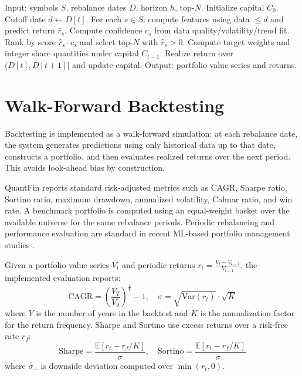 \documentclass[conference]{IEEEtran}
\begin{document}
\begin{algorithm}
\caption{Leakage-aware monthly rebalancing (simplified)}
\label{alg:rebalance}
\begin{algorithmic}
\STATE Input: symbols $S$, rebalance dates $D$, horizon $h$, top-$N$.
\STATE Initialize capital $C_0$.
\STATE Cutoff date $d \leftarrow D[t]$.
\STATE For each $s \in S$: compute features using data $\le d$ and predict return $\hat{r}_{s}$.
\STATE Compute confidence $c_s$ from data quality/volatility/trend fit.
\STATE Rank by score $\hat{r}_{s}\cdot c_s$ and select top-$N$ with $\hat{r}_{s} > 0$.
\STATE Compute target weights and integer share quantities under capital $C_{t-1}$.
\STATE Realize return over $(D[t], D[t+1]]$ and update capital.
\ENDFOR
\STATE Output: portfolio value series and returns.
\end{algorithmic}
\end{algorithm}

\section{Walk-Forward Backtesting}\label{sec:backtest}
Backtesting is implemented as a walk-forward simulation: at each rebalance date, the system generates predictions using only historical data up to that date, constructs a portfolio, and then evaluates realized returns over the next period. This avoids look-ahead bias by construction.

QuantFin reports standard risk-adjusted metrics such as CAGR, Sharpe ratio, Sortino ratio, maximum drawdown, annualized volatility, Calmar ratio, and win rate. A benchmark portfolio is computed using an equal-weight basket over the available universe for the same rebalance periods. Periodic rebalancing and performance evaluation are standard in recent ML-based portfolio management studies \cite{lim2022dynamicrebalancing,aithal2023realtime}.

Given a portfolio value series $V_t$ and periodic returns $r_t=\frac{V_t-V_{t-1}}{V_{t-1}}$, the implemented evaluation reports:
\begin{equation}
\mathrm{CAGR} = \left(\frac{V_T}{V_0}\right)^{\tfrac{1}{Y}}-1,\quad \sigma = \sqrt{\mathrm{Var}(r_t)}\cdot\sqrt{K}
\end{equation}
where $Y$ is the number of years in the backtest and $K$ is the annualization factor for the return frequency. Sharpe and Sortino use excess returns over a risk-free rate $r_f$:
\begin{equation}
\mathrm{Sharpe} = \frac{\mathbb{E}[r_t-r_f/K]}{\sigma},\quad
\mathrm{Sortino} = \frac{\mathbb{E}[r_t-r_f/K]}{\sigma_-}
\end{equation}
where $\sigma_-$ is downside deviation computed over $\min(r_t,0)$.
\end{document}
